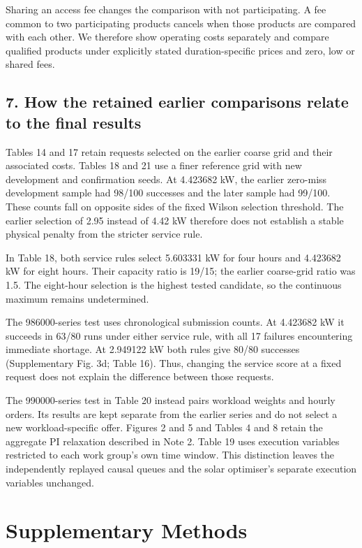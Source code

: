 \documentclass[10pt,a4paper]{article}
\begin{document}
Sharing an access fee changes the comparison with not participating. A fee common to two participating products cancels when those products are compared with each other. We therefore show operating costs separately and compare qualified products under explicitly stated duration-specific prices and zero, low or shared fees.


\subsection{7. How the retained earlier comparisons relate to the final results}

Tables 14 and 17 retain requests selected on the earlier coarse grid and their associated costs. Tables 18 and 21 use a finer reference grid with new development and confirmation seeds. At 4.423682 kW, the earlier zero-miss development sample had 98/100 successes and the later sample had 99/100. These counts fall on opposite sides of the fixed Wilson selection threshold. The earlier selection of 2.95 instead of 4.42 kW therefore does not establish a stable physical penalty from the stricter service rule.


In Table 18, both service rules select 5.603331 kW for four hours and 4.423682 kW for eight hours. Their capacity ratio is 19/15; the earlier coarse-grid ratio was 1.5. The eight-hour selection is the highest tested candidate, so the continuous maximum remains undetermined.


The 986000-series test uses chronological submission counts. At 4.423682 kW it succeeds in 63/80 runs under either service rule, with all 17 failures encountering immediate shortage. At 2.949122 kW both rules give 80/80 successes (Supplementary Fig. 3d; Table 16). Thus, changing the service score at a fixed request does not explain the difference between those requests.


The 990000-series test in Table 20 instead pairs workload weights and hourly orders. Its results are kept separate from the earlier series and do not select a new workload-specific offer. Figures 2 and 5 and Tables 4 and 8 retain the aggregate PI relaxation described in Note 2. Table 19 uses execution variables restricted to each work group's own time window. This distinction leaves the independently replayed causal queues and the solar optimiser's separate execution variables unchanged.


\clearpage
\section{Supplementary Methods}
\end{document}
